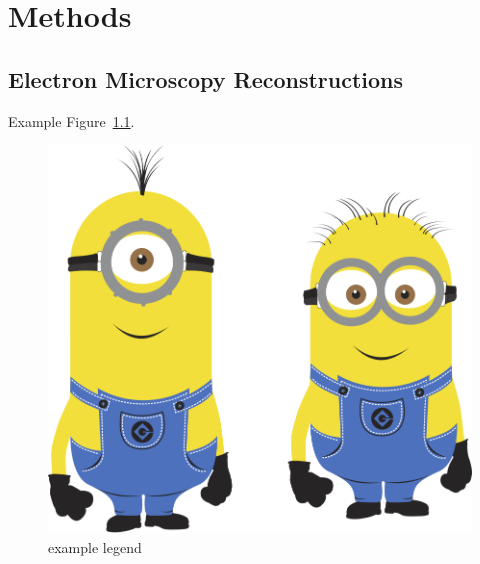 
\chapter{Methods}

\ifpdf
    \graphicspath{{Chapter2/Figs/Raster/}{Chapter2/Figs/PDF/}{Chapter2/Figs/}}
\else
    \graphicspath{{Chapter2/Figs/Vector/}{Chapter2/Figs/}}
\fi


\section[Short title]{Electron Microscopy Reconstructions}

Example Figure~\ref{fig:minion}.



\begin{figure}[htbp!] 
\centering    
\includegraphics[width=1.0\textwidth]{minion}
\caption[Minion]{example legend}
\label{fig:minion}
\end{figure}

